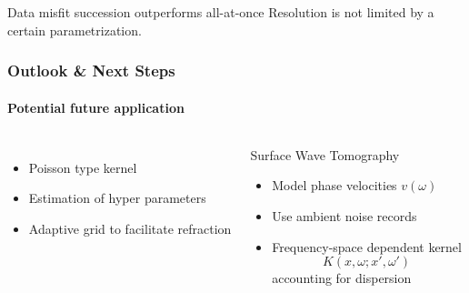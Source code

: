 \documentclass[aspectratio=169, t, 10pt,
    ]{beamer}
\begin{document}
Data misfit
succession outperforms all-at-once
Resolution is not limited by a certain parametrization.


\begin{frame}
    \frametitle{Outlook \& Next Steps }
    \framesubtitle{Potential future application}

\begin{columns}
%

    \begin{itemize}
        \item Poisson type kernel
        \item Estimation of hyper parameters
        \item Adaptive grid to facilitate refraction
    \end{itemize}

    \begin{block}{Surface Wave Tomography}
        \begin{itemize}
            \item Model phase velocities $v(\omega)$
            \item Use ambient noise records
            \item Frequency-space dependent kernel
                \begin{equation}
                    K(x,\omega; x', \omega')
                \end{equation}
                accounting for dispersion
        \end{itemize}
    \end{block}


\end{columns}
\end{frame}
\end{document}

